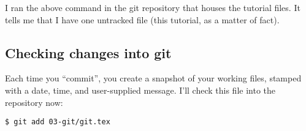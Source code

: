 \documentclass{awe-art}
\begin{document}
I ran the above command in the git repository that houses the tutorial
files.  It tells me that I have one untracked file (this tutorial, as a
matter of fact).
\subsection{Checking changes into git}
\label{sec-2-2}

Each time you “commit”, you create a snapshot of your working files,
stamped with a date, time, and user-supplied message.  I’ll check this
file into the repository now:
\begin{verbatim}
$ git add 03-git/git.tex
\end{verbatim}
\end{document}
